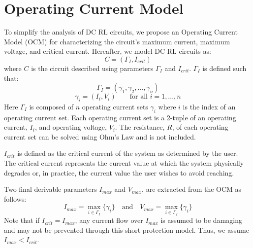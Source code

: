 \documentclass[11pt,oneside]{report}
\begin{document}
    \section{Operating Current Model}
    To simplify the analysis of DC RL circuits, we propose an Operating Current Model (OCM) for characterizing the circuit's maximum current, maximum voltage, and critical current. Hereafter, we model DC RL circuits as:
    \begin{equation}\label{eq:OCM}
    C = (\Gamma_{I}, I_{crit})
    \end{equation}
    where $C$ is the circuit described using parameters $\Gamma_{I}$ and $I_{crit}$. $\Gamma_{I}$ is defined such that:
    \begin{equation}\label{eq:OCMTuples}
    \Gamma_{I} = (\gamma_{1},\gamma_{2},...,\gamma_{n})
    \end{equation}
    \begin{equation}\label{eq:OCMIVPairs}
    \gamma_{i} = (I_{i},V_{i})\qquad\text{for all  } i=1,...,n
    \end{equation}
    Here $\Gamma_{I}$ is composed of $n$ operating current sets $\gamma_{i}$ where $i$ is the index of an operating current set. Each operating current set is a 2-tuple of an operating current, $I_{i}$, and operating voltage, $V_{i}$. The resistance, $R$, of each operating current set can be solved using Ohm's Law and is not included. 
    
    $I_{crit}$ is defined as the critical current of the system as determined by the user. The critical current represents the current value at which the system physically degrades or, in practice, the current value the user wishes to avoid reaching.
    
    Two final derivable parameters $I_{max}$ and $V_{max}$, are extracted from the OCM as follows:
    \begin{equation}\label{eq:Imax}
    I_{max} = \max_{i \in \Gamma_{I}} \{\gamma_i\} \quad \text{and} \quad V_{max} = \max_{i \in \Gamma_{I}} \{\gamma_i\}
    \end{equation}
    Note that if $I_{crit} = I_{max}$, any current flow over $I_{max}$ is assumed to be damaging and may not be prevented through this short protection model. Thus, we assume $I_{max} < I_{crit}$.
\end{document}
